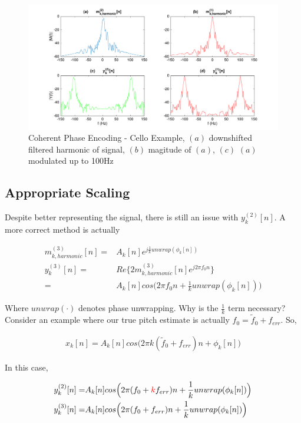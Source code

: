 \documentclass [11pt, proquest,oneside] {ganter_thesis}[2015/03/03]
\newcommand*{\mathcolor}{}
\def\mathcolor#1#{\mathcoloraux{#1}}
\newcommand*{\mathcoloraux}[3]{%
  \protect\leavevmode
  \begingroup
    \color#1{#2}#3%
  \endgroup
}
\begin{document}
\begin{figure}[!ht]
  \centering
    \includegraphics[width=1\textwidth]{matlab/real_vs_magnitude_example}   
    \caption{Coherent Phase Encoding - Cello Example, $(a)$ downshifted filtered harmonic of signal, $(b)$ magitude of $(a)$, $(c)$ $(a)$ modulated up to 100Hz}\label{fig:real_vs_magnitude_example}
\end{figure}


\subsection{Appropriate Scaling}

Despite better representing the signal, there is still an issue with $y_k^{(2)}[n]$.  A more correct method is actually

\begin{align}
\label{eq:realVSmag3}
m^{(3)}_{k,harmonic}[n] =& A_k[n]e^{j\frac{1}{k} unwrap(\phi_k[n])} \\
y_k^{(3)}[n] =& Re\{ 2 m^{(3)}_{k,harmonic}[n] e^{j2\pi f_0 n} \}  \\
=& A_k[n]cos\Big(2\pi f_0 n + \frac{1}{k}unwrap(\phi_k[n])\Big) \nonumber
\end{align}

Where $unwrap(\cdot)$ denotes phase unwrapping. Why is the $\frac{1}{k}$ term necessary?  Consider an example where our true pitch estimate is actually $f_{0} = \tilde{f}_0 + f_{err}$.  So,

\begin{align}
x_k[n] = A_k[n]cos\Big(2\pi k(\tilde{f}_0 + f_{err})n + \phi_k[n]\Big)
\end{align}

In this case,

\begin{align}
\label{eq:wrong_scaling}
y_k^{(2)}[n] =& A_k[n]cos\Big(2\pi (f_0 + \mathcolor{red}{k}f_{err})n + \frac{1}{k}unwrap(\phi_k[n])\Big) \\
y_k^{(3)}[n] =& A_k[n]cos\Big(2\pi (f_0 + f_{err})n + \frac{1}{k}unwrap(\phi_k[n])\Big)
\end{align}
\end{document}
